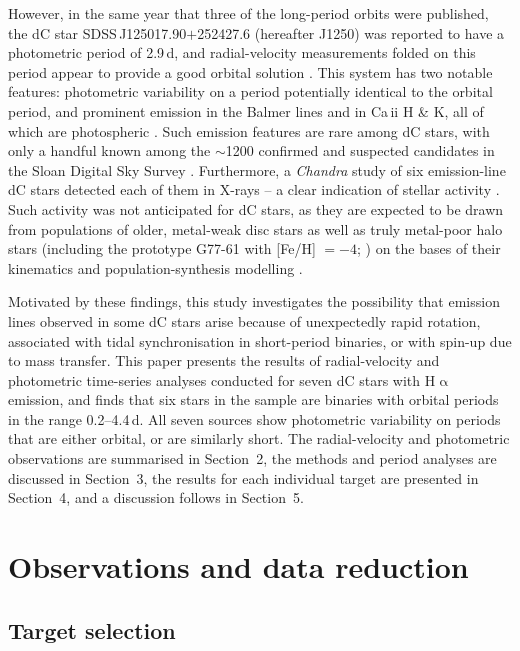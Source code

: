 \documentclass[fleqn,usenatbib,useAMS]{mnras}
\begin{document}
However, in the same year that three of the long-period orbits were published, the dC star SDSS\,J125017.90$+$252427.6 (hereafter J1250) was reported to have a photometric period of 2.9\,d, and radial-velocity measurements folded on this period appear to provide a good orbital solution \citep{Margon18}.  This system has two notable features: photometric variability on a period potentially identical to the orbital period, and prominent emission in the Balmer lines and in Ca\,{\sc ii} H \& K, all of which are photospheric \citep{Margon18}.  Such emission features are rare among dC stars, with only a handful known among the $\sim$1200 confirmed and suspected candidates in the Sloan Digital Sky Survey \citep{Green2013}.  Furthermore, a {\em Chandra} study of six emission-line dC stars detected each of them in X-rays -- a clear indication of stellar activity \citep{Green19}.  Such activity was not anticipated for dC stars, as they are expected to be drawn from populations of older, metal-weak disc stars as well as truly metal-poor halo stars (including the prototype G77-61 with [Fe/H] $= -4$; \citealt{Plez05}) on the bases of their kinematics \citep{Harris98,Plant16,Farihi18} and population-synthesis modelling \citep{Kool95}.

Motivated by these findings, this study investigates the possibility that emission lines observed in some dC stars arise because of unexpectedly rapid rotation, associated with tidal synchronisation in short-period binaries, or with spin-up due to mass transfer.  This paper presents the results of radial-velocity and photometric time-series analyses conducted for seven dC stars with H$\upalpha$ emission, and finds that six stars in the sample are binaries with orbital periods in the range 0.2--4.4\,d.  All seven sources show photometric variability on periods that are either orbital, or are similarly short.  The radial-velocity and photometric observations are summarised in Section~2, the methods and period analyses are discussed in Section~3, the results for each individual target are presented in Section~4, and a discussion follows in Section~5.

\section{Observations and data reduction}

\subsection{Target selection}
\end{document}
